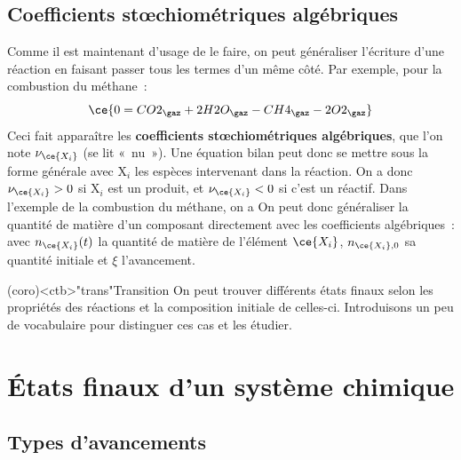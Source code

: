 \documentclass[../../main/main.tex]{subfiles}
\begin{document}
\subsection{Coefficients stœchiométriques algébriques}

Comme il est maintenant d'usage de le faire, on peut généraliser l'écriture
d'une réaction en faisant passer tous les termes d'un même côté. Par exemple,
pour la combustion du méthane~:
\[
	\ce{0 = CO2_{\gaz} + 2H2O_{\gaz} - CH4_{\gaz} - 2O2_{\gaz}}
\]
Ceci fait apparaître les \textbf{coefficients stœchiométriques algébriques}, que
l'on note $\nu_{\ce{X_i}}$ (se lit «~nu~»). Une équation bilan peut donc se
mettre sous la forme générale
\psw{%
	\[
		\boxed{\sum_i \nu_{\ce{X_i}}\mathrm{X}_i = 0}
	\]
}
avec $\mathrm{X}_i$ les espèces intervenant dans la réaction. On a donc
$\nu_{\ce{X_i}} >0$ si $\mathrm{X}_i$ est un produit, et $\nu_{\ce{X_i}} < 0$ si
c'est un réactif. Dans l'exemple de la combustion du méthane, on a
\psw{%
	\[
		\begin{array}{rcl}
			\nu_{\ce{CH4}} = -1 & \qquad \text{et} & \qquad \nu_{\ce{O2}} = -2 \\
			\nu_{\ce{CO2}} = 1  & \qquad \text{et} & \qquad \nu_{\ce{H20}} = 2
		\end{array}
	\]
}
On peut donc généraliser la quantité de matière d'un composant directement avec
les coefficients algébriques~:
\psw{%
	\[
		\boxed{n_{\ce{X_i}}(t) = n_{\ce{X_i},0} + \nu_{\ce{X_i}}\xi(t)}
	\]
}
avec $n_{\ce{X_i}}(t)$ la quantité de matière de l'élément $\ce{X_i}$,
$n_{\ce{X_i},0}$ sa quantité initiale et $\xi$ l'avancement.

\begin{tcn}(coro)<ctb>"trans"{Transition}
	On peut trouver différents états finaux selon les propriétés des réactions
	et la composition initiale de celles-ci. Introduisons un peu de vocabulaire
	pour distinguer ces cas et les étudier.
\end{tcn}

\section{États finaux d'un système chimique}
\subsection{Types d'avancements}
\end{document}
